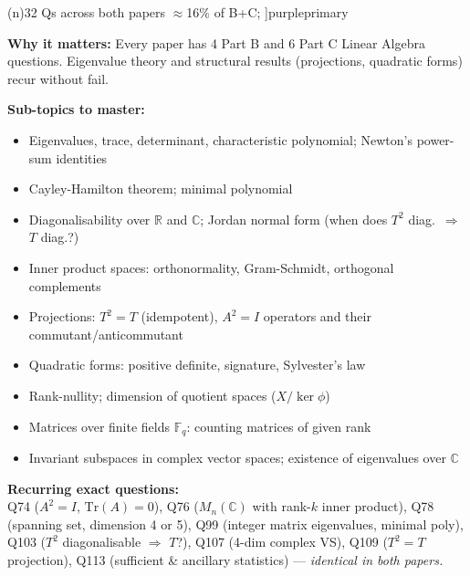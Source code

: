 \documentclass[12pt,a4paper]{article}
\newcommand{\badge}[2]{%
  \tikz[baseline=(n.base)]\node[fill=#1!20, draw=#1!60, text=#1!80!black,
    rounded corners=3pt, inner xsep=5pt, inner ysep=2pt,
    font=\tiny\bfseries](n){#2};%
}
\newcommand{\badgepurple}[1]{\badge{purpleprimary}{#1}}
\begin{document}
\vspace{8pt}

\begin{prioritybox}[2.\quad Linear Algebra \hfill\badgepurple{32 Qs across both papers $\approx$16\% of B+C}]{purpleprimary}

\textbf{Why it matters:} Every paper has 4 Part B and 6 Part C Linear Algebra questions. Eigenvalue theory and structural results (projections, quadratic forms) recur without fail.

\medskip
\textbf{Sub-topics to master:}
\begin{itemize}[leftmargin=1.5em, itemsep=2pt]
  \item Eigenvalues, trace, determinant, characteristic polynomial; Newton's power-sum identities
  \item Cayley-Hamilton theorem; minimal polynomial
  \item Diagonalisability over $\mathbb{R}$ and $\mathbb{C}$; Jordan normal form (when does $T^2$ diag.\ $\Rightarrow$ $T$ diag.?)
  \item Inner product spaces: orthonormality, Gram-Schmidt, orthogonal complements
  \item Projections: $T^2=T$ (idempotent), $A^2=I$ operators and their commutant/anticommutant
  \item Quadratic forms: positive definite, signature, Sylvester's law
  \item Rank-nullity; dimension of quotient spaces ($X/\ker\phi$)
  \item Matrices over finite fields $\mathbb{F}_q$: counting matrices of given rank
  \item Invariant subspaces in complex vector spaces; existence of eigenvalues over $\mathbb{C}$
\end{itemize}

\medskip
\textbf{Recurring exact questions:}\\
\small Q74 ($A^2=I$, $\mathrm{Tr}(A)=0$), Q76 ($M_n(\mathbb{C})$ with rank-$k$ inner product), Q78 (spanning set, dimension 4 or 5), Q99 (integer matrix eigenvalues, minimal poly), Q103 ($T^2$ diagonalisable $\Rightarrow$ $T$?), Q107 (4-dim complex VS), Q109 ($T^2=T$ projection), Q113 (sufficient \& ancillary statistics) --- \textit{identical in both papers.}
\end{prioritybox}

\vspace{8pt}
\end{document}
